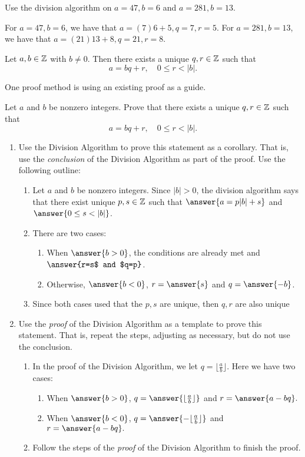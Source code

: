 \documentclass{ximera}
\begin{document}
\begin{br}
 Use the division algorithm on $a=47, b=6$ and $a=281, b=13$.
\end{br}
\begin{solution}
For $a=47, b=6$, we have that $a=(7)6+5, q=7, r=5$.
For $a=281, b=13$, we have that $a=(21)13+8, q=21, r=8$.
\end{solution}

\begin{cor}\label{div-alg-neg}
 Let $a,b\in\mathbb Z$ with $b\neq0$. Then there exists a unique $q,r\in\mathbb Z$ such that \[a=bq+r, \quad 0\leq r <|b|.\]
\end{cor}
One proof method is using an existing proof as a guide.

\begin{br}  Let $a$ and $b$ be nonzero integers. Prove that there exists a unique $q,r\in\mathbb Z$ such that 
  \[a=bq+r, \quad 0\leq r <|b|.\]
  \begin{enumerate}
    	\item Use the Division Algorithm to prove this statement as a corollary. That is, use the \emph{conclusion} of the Division Algorithm as part of the proof.  Use the following outline:
    	\begin{enumerate}
		\item  Let $a$ and $b$ be nonzero integers. Since $|b|>0$, the division algorithm says that there exist unique $p,s\in\mathbb Z$ such that $\answer{a=p|b|+s}$ and $\answer{0\leq s<|b|}$.
      		\item There are two cases:
      		\begin{enumerate}
        			\item When $\answer{b>0}$, the conditions are already met and $\answer{r=s$ and $q=p}$.
        			\item Otherwise, $\answer{b<0}$, $r=\answer{s}$ and $q=\answer{-b}$.
      		\end{enumerate}
      		\item Since both cases used that the $p,s$ are unique, then $q,r$ are also unique
	\end{enumerate}
    	\item Use the \emph{proof} of the Division Algorithm as a template to prove this statement. That is, repeat the steps, adjusting as necessary, but do not use the conclusion.
    	\begin{enumerate}
    		\item In the proof of the Division Algorithm, we let $q=\lfloor\frac{a}{b}\rfloor$. Here we have two cases:
    		\begin{enumerate}
      			\item When $\answer{b>0}$, $q=\answer{\lfloor\frac{a}{b}\rfloor}$ and $r=\answer{a-bq}.$
      			\item When $\answer{b<0}$, $q=\answer{-\lfloor\frac{a}{b}\rfloor}$ and $r=\answer{a-bq}.$   
		\end{enumerate}
    		\item Follow the steps of the \emph{proof} of the Division Algorithm to finish the proof.
    	\end{enumerate}


\end{enumerate}
\end{br}
\end{document}
